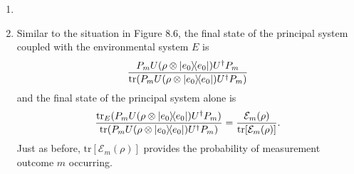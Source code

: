 \documentclass[a4paper,12pt]{article}
\begin{document}
\begin{enumerate}
\begin{align*}
\begin{array}{cccc}
                    \rho_{00}i & 0 & \rho_{01}i & 0.
                \end{array}
            \right]
            \left[
                \begin{array}{cccc}
                    0 & 0 & 1 & -i \\
                    0 & 0 & -i & 1 \\
                    1 & i & 0 & 0 \\
                    i & 1 & 0 & 0
                \end{array}
            \right] \\
            &= \frac{1}{2} \left[
                \begin{array}{cccc}
                    \rho_{11} & \rho_{11}i & \rho_{10} & -\rho_{10}i \\
                    -\rho_{11}i & \rho_{11} & -\rho_{10}i & -\rho_{10} \\
                    \rho_{01} & \rho_{01}i & \rho_{00} & -\rho_{00}i \\
                    \rho_{01}i & -\rho_{01} & \rho_{00}i & \rho_{00}
                \end{array}
            \right].
        \end{align*}
        and
        \begin{align*}
            \mathcal{E}(\rho) = \text{tr}_{\text{env}} [U (\rho \otimes \rho_{\text{env}}) U^\dagger] = \left[
                \begin{array}{cc}
                    \rho_{11} & 0 \\
                    0 & \rho_{00}
                \end{array}
            \right].
        \end{align*}

    \item[\textbf{8.7:}]

    \item[\textbf{8.9:}]
        Similar to the situation in Figure 8.6, the final state of the principal system coupled with the environmental system $E$ is
        \begin{align*}
            \frac{P_m U (\rho \otimes \dyad{e_0}{e_0}) U^\dagger P_m}{\text{tr}(P_m U (\rho \otimes \dyad{e_0}{e_0}) U^\dagger P_m)}
        \end{align*}
        and the final state of the principal system alone is
        \begin{align*}
            \frac{\text{tr}_E(P_m U (\rho \otimes \dyad{e_0}{e_0}) U^\dagger P_m)}{\text{tr}(P_m U (\rho \otimes \dyad{e_0}{e_0}) U^\dagger P_m)} = \frac{\mathcal{E}_m(\rho)}{\text{tr}[\mathcal{E}_m(\rho)]}.
        \end{align*}
        Just as before, $\text{tr}[\mathcal{E}_m(\rho)]$ provides the probability of measurement outcome $m$ occurring.


\end{enumerate}
\end{document}
